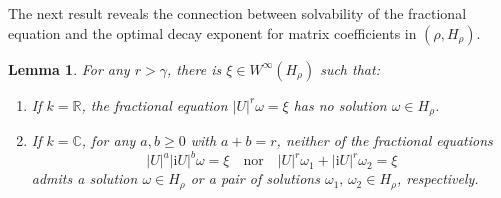 \documentclass[11 pt]{amsart}
\newcommand{\RR}{\mathbb{R}}
\newcommand{\CC}{\mathbb{C}}
\newtheorem{lemma}[theorem]{Lemma}
\theoremstyle{definition}
\numberwithin{equation}{section}
\begin{document}
The next result reveals the connection between solvability of the fractional
equation and the optimal decay exponent for matrix coefficients in $(\rho,H_\rho)$.
\begin{lemma}\label{le:13}
For any $r>\gamma$, there is $\xi\in W^{\infty}(H_\rho)$ such that:
\begin{enumerate}
  \item If $k=\RR$, the fractional equation $ |U|^r\omega=\xi$ has no solution $\omega\in H_\rho$.
  \item If $k=\CC$, for any $a,b\geq0$ with $a+b=r$, \emph{neither} of the
  fractional equations
  \[
    |U|^{a}|\mathrm{i} U|^{b}\omega=\xi
    \quad\text{nor}\quad
    |U|^{r}\omega_1+|\mathrm{i} U|^{r}\omega_2=\xi
  \]
  admits a solution $\omega\in H_\rho$ or a pair of solutions
  $\omega_1,\,\omega_2\in H_\rho$, respectively.
\end{enumerate}
\end{lemma}
\end{document}
